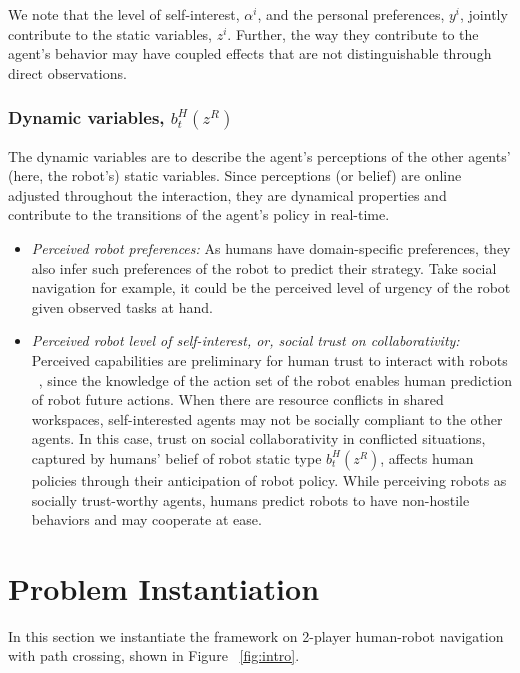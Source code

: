 \documentclass[letterpaper, 10 pt, conference]{ieeeconf}  %
\begin{document}
We note that the level of self-interest, $\alpha^i$, and the personal 
preferences, $y^i$, jointly contribute to the static variables, $z^i$. 
Further, the way they contribute to the agent's behavior may have coupled 
effects that are not distinguishable through direct observations.

\subsubsection{Dynamic variables, $b^H_t(z^{R})$}%
The dynamic variables are to describe the agent's perceptions of the other 
agents' (here, the robot's) static variables. Since perceptions (or belief) are 
online adjusted throughout the interaction, they are dynamical properties and 
contribute to the transitions of the agent's policy in real-time.
\begin{itemize}
  \item \textit{Perceived robot preferences:} As humans have domain-specific 
    preferences, they also infer such preferences of the robot to predict 
    their strategy. Take social navigation for example, it could be the 
    perceived level of urgency of the robot given observed tasks at hand.   
  \item \textit{Perceived robot level of self-interest, or, social trust on collaborativity:}
  Perceived capabilities are preliminary for human trust to interact with robots ~\cite{yang2017evaluating}, since the knowledge of the action set of the robot enables 
human prediction of robot future actions. When there are resource conflicts in shared workspaces, self-interested agents may not be socially compliant to the other agents. 
In this case, trust on social collaborativity in conflicted situations, captured by humans' belief of robot static type $b^H_t(z^R)$, affects human policies through their anticipation of robot policy. While perceiving robots as socially trust-worthy agents, humans predict robots to have non-hostile behaviors and may cooperate at ease.   
\end{itemize}



\section{Problem Instantiation}
In this section we instantiate the framework on 2-player human-robot navigation with path 
crossing, shown in Figure ~\ref{fig:intro}.

\end{document}
